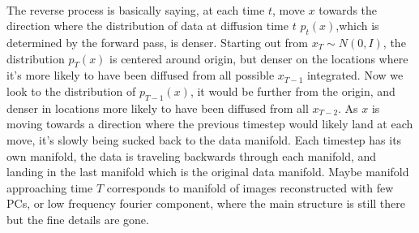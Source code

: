 \documentclass{article}
\begin{document}
\paragraph{}
The reverse process is basically saying, at each time $t$, move $x$ towards the direction where the distribution of data at diffusion time $t$ $p_t(x)$,which is determined by the forward pass, is denser.  Starting out from $x_T \sim N(0,I)$, the distribution $p_T(x)$ is centered around origin, but denser on the locations where it's more likely to have been diffused from all possible $x_{T-1}$ integrated. Now we look to the distribution of $p_{T-1}(x)$, it would be further from the origin, and denser in locations more likely to have been diffused from all $x_{T-2}$. As $x$ is moving towards a direction where the previous timestep would likely land at each move, it's slowly being sucked back to the data manifold.  Each timestep has its own manifold, the data is traveling backwards through each manifold, and landing in the last manifold which is the original data manifold. Maybe manifold approaching time $T$ corresponds to manifold of images reconstructed with few PCs, or low frequency fourier component, where the main structure is still there but the fine details are gone.
\end{document}
